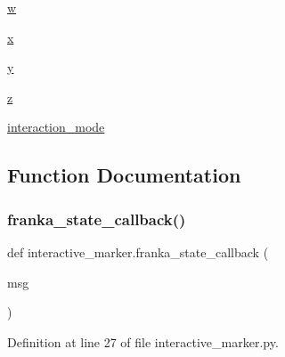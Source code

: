 \begin{DoxyCompactItemize}
\item 
\hyperlink{namespaceinteractive__marker_a762d2be287d5bc9ccc79401f4c401bd3}{w}
\item 
\hyperlink{namespaceinteractive__marker_acda52804aef30b460a72fb21ee01d69d}{x}
\item 
\hyperlink{namespaceinteractive__marker_a5e45ec67a60dd2f10e5b53a9274e4730}{y}
\item 
\hyperlink{namespaceinteractive__marker_ae4fadbd064c862c7bd45695a76bb0af4}{z}
\item 
\hyperlink{namespaceinteractive__marker_ae2bafebdee41a12635569a296fa3bf6e}{interaction\+\_\+mode}
\end{DoxyCompactItemize}


\subsection{Function Documentation}
\mbox{\label{namespaceinteractive__marker_a3ca26991be43b2dfab3662fab7d29557}} 
\subsubsection{\texorpdfstring{franka\+\_\+state\+\_\+callback()}{franka\_state\_callback()}}
{\footnotesize\ttfamily def interactive\+\_\+marker.\+franka\+\_\+state\+\_\+callback (\begin{DoxyParamCaption}\item[{}]{msg }\end{DoxyParamCaption})}



Definition at line 27 of file interactive\+\_\+marker.\+py.


